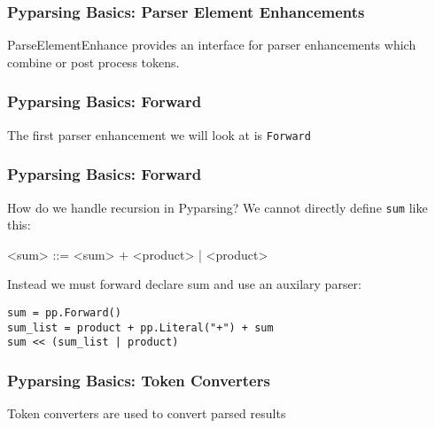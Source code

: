 \documentclass{beamer}
\begin{document}
\begin{frame}
\frametitle{Pyparsing Basics: Parser Element Enhancements}
ParseElementEnhance provides an interface for parser enhancements which combine or post process tokens.
\begin{center}
\end{center}

\end{frame}


\begin{frame}
\frametitle{Pyparsing Basics: Forward}
The first parser enhancement we will look at is \texttt{Forward}
\begin{center}
\end{center}
\end{frame}

\begin{frame}[fragile]
\frametitle{Pyparsing Basics: Forward}
How do we handle recursion in Pyparsing? We cannot directly define \texttt{sum} like this:
\medskip
\begin{grammar}
<sum> ::= <sum> $\mathbf{+}$ <product> | <product>
\end{grammar}
\medskip
Instead we must forward declare sum and use an auxilary parser:
\begin{verbatim}
sum = pp.Forward()
sum_list = product + pp.Literal("+") + sum
sum << (sum_list | product)
\end{verbatim}
\end{frame}


\begin{frame}
\frametitle{Pyparsing Basics: Token Converters}
Token converters are used to convert parsed results
\begin{center}
\end{center}

\end{frame}
\end{document}
